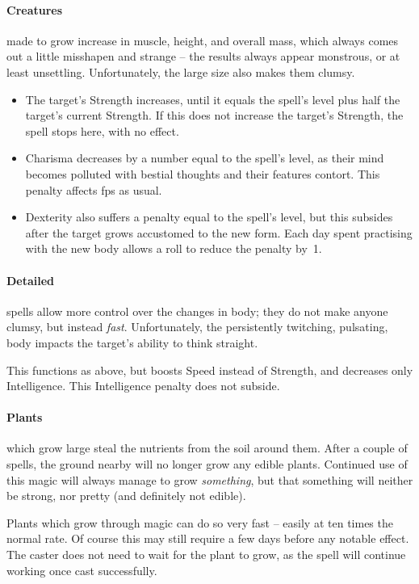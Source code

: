 \begin{multicols}{2}
\paragraph{Creatures}
made to grow increase in muscle, height, and overall mass, which always comes out a little misshapen and strange -- the results always appear monstrous, or at least unsettling.
Unfortunately, the large size also makes them clumsy.

\begin{itemize}
  \item
  The target's Strength increases, until it equals the spell's level plus half the target's current Strength.
  If this does not increase the target's Strength, the spell stops here, with no effect.
  \item
  Charisma decreases by a number equal to the spell's level, as their mind becomes polluted with bestial thoughts and their features contort.
  This penalty affects \glspl{fp} as usual.
  \item
  Dexterity also suffers a penalty equal to the spell's level, but this subsides after the target grows accustomed to the new form.
  Each day spent practising with the new body allows a  roll to reduce the penalty by~1.
\end{itemize}

\paragraph{Detailed}
spells allow more control over the changes in body; they do not make anyone clumsy, but instead \emph{fast}.
Unfortunately, the persistently twitching, pulsating, body impacts the target's ability to think straight.

This functions as above, but boosts Speed instead of Strength, and decreases only Intelligence.
This Intelligence penalty does not subside.

\paragraph{Plants}
which grow large steal the nutrients from the soil around them.
After a couple of spells, the ground nearby will no longer grow any edible plants.
Continued use of this magic will always manage to grow \emph{something}, but that something will neither be strong, nor pretty (and definitely not edible).

Plants which grow through magic can do so very fast -- easily at ten times the normal rate.
Of course this may still require a few days before any notable effect.
The caster does not need to wait for the plant to grow, as the spell will continue working once cast successfully.


\end{multicols}
